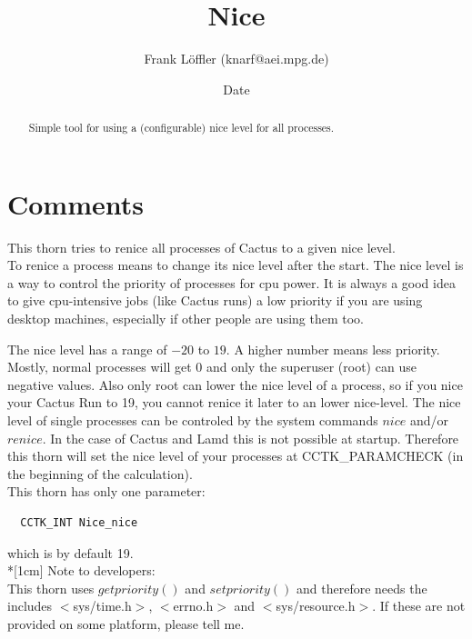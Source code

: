 \documentclass{article}
\begin{document}
\title{Nice}
\author{Frank L\"offler (knarf@aei.mpg.de)}
\date{$ $Date$ $}

\maketitle


\begin{abstract}
Simple tool for using a (configurable) nice level for all processes.
\end{abstract}

\section{Comments}

This thorn tries to renice all processes of Cactus to a given nice level.\\
To renice a process means to change its nice level after the start. The nice
level is a way to control the priority of processes for cpu power. It is
always a good idea to give cpu-intensive jobs (like Cactus runs) a low
priority if you are using desktop machines, especially if other people are
using them too.

The nice level has a range of $-20$ to $19$. A higher number means less
priority. Mostly, normal processes will get $0$ and only the superuser
(root) can use negative values. Also only root can lower the nice level
of a process, so if you nice your Cactus Run to 19, you cannot renice it
later to an lower nice-level. The nice level of single
processes can be controled by the system commands $nice$ and/or $renice$.
In the case of Cactus and Lamd this is not possible at startup. Therefore
this thorn will set the nice level of your processes at CCTK\_PARAMCHECK
(in the beginning of the calculation).\\
This thorn has only one parameter:
\begin{verbatim}
  CCTK_INT Nice_nice
\end{verbatim}
which is by default 19.\\*[1cm]
Note to developers:\\
This thorn uses $getpriority()$ and $setpriority()$ and therefore needs
the includes $<$sys/time.h$>$, $<$errno.h$>$ and $<$sys/resource.h$>$.
If these are not provided on some platform, please tell me.
\end{document}
